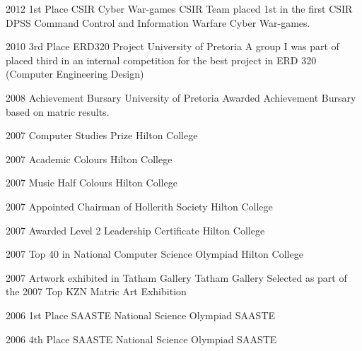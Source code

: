 \documentclass[]{friggeri-cv}
\begin{document}
\begin{entrylist}
	\entry
	{2012}
	{1st Place CSIR Cyber War-games}
	{CSIR}
	{Team placed 1st in the first CSIR DPSS Command Control and Information Warfare Cyber War-games.}
	
	\entry
	{2010}
	{3rd Place ERD320 Project}
	{University of Pretoria}
	{A group I was part of placed third in an internal competition for the best project in ERD 320 	(Computer Engineering Design)}
	
	\entry
	{2008}
	{Achievement Bursary}
	{University of Pretoria}
	{Awarded Achievement Bursary based on matric results.}
	
	\entry
	{2007}
	{Computer Studies Prize}
	{Hilton College}
	{}

	\entry
	{2007}
	{Academic Colours}
	{Hilton College}
	{}
	

	
	\entry
	{2007}
	{Music Half Colours}
	{Hilton College}
	{}
	
	\entry
	{2007}
	{Appointed Chairman of Hollerith Society}
	{Hilton College}
	{}
	
	\entry
	{2007}
	{Awarded Level 2 Leadership Certificate}
	{Hilton College}
	{}
	
		\end{entrylist}
\begin{entrylist}
	
	\entry
	{2007}
	{Top 40 in National Computer Science Olympiad}
	{Hilton College}
	{}
	
	\entry
	{2007}
	{Artwork exhibited in Tatham Gallery}
	{Tatham Gallery}
	{Selected as part of the 2007 Top KZN Matric Art Exhibition}
	
	\entry
	{2006}
	{1st Place SAASTE National Science Olympiad}
	{SAASTE}
	{}
	
	\entry
	{2006}
	{4th Place SAASTE National Science Olympiad}
	{SAASTE}
	{}
\end{entrylist}
\end{document}
